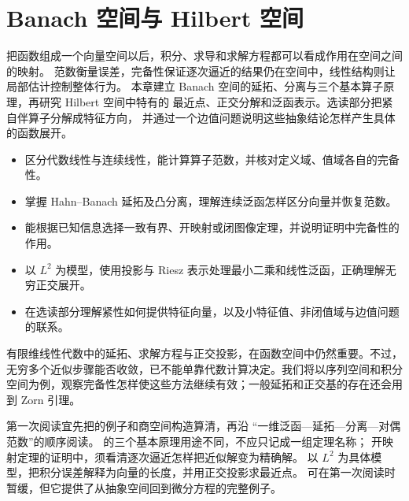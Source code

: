 \chapter{Banach 空间与 Hilbert 空间}
\label{b1:ch:08}
\begin{chapterabstract}
把函数组成一个向量空间以后，积分、求导和求解方程都可以看成作用在空间之间的映射。
范数衡量误差，完备性保证逐次逼近的结果仍在空间中，线性结构则让局部估计控制整体行为。
本章建立 Banach 空间的延拓、分离与三个基本算子原理，再研究 Hilbert 空间中特有的
最近点、正交分解和泛函表示。选读部分把紧自伴算子分解成特征方向，
并通过一个边值问题说明这些抽象结论怎样产生具体的函数展开。
\end{chapterabstract}

\begin{learninggoals}
\begin{itemize}
\item\label{b1:item:08-goal-norm}区分代数线性与连续线性，能计算算子范数，并核对定义域、值域各自的完备性。
\item\label{b1:item:08-goal-dual}掌握 Hahn--Banach 延拓及凸分离，理解连续泛函怎样区分向量并恢复范数。
\item\label{b1:item:08-goal-principles}能根据已知信息选择一致有界、开映射或闭图像定理，并说明证明中完备性的作用。
\item\label{b1:item:08-goal-hilbert}以 \(L^2\) 为模型，使用投影与 Riesz 表示处理最小二乘和线性泛函，正确理解无穷正交展开。
\item\label{b1:item:08-goal-spectral}在选读部分理解紧性如何提供特征向量，以及小特征值、非闭值域与边值问题的联系。
\end{itemize}
\end{learninggoals}

有限维线性代数中的延拓、求解方程与正交投影，在函数空间中仍然重要。不过，无穷多个近似步骤能否收敛，已不能单靠代数计算决定。我们将以序列空间和积分空间为例，观察完备性怎样使这些方法继续有效；一般延拓和正交基的存在还会用到 Zorn 引理。

\ProseParagraphBreak

第一次阅读宜先把的例子和商空间构造算清，再沿
“一维泛函—延拓—分离—对偶范数”的顺序阅读。
的三个基本原理用途不同，不应只记成一组定理名称；
开映射定理的证明中，须看清逐次逼近怎样把近似解变为精确解。
以 \(L^2\) 为具体模型，把积分误差解释为向量的长度，并用正交投影求最近点。
可在第一次阅读时暂缓，但它提供了从抽象空间回到微分方程的完整例子。

